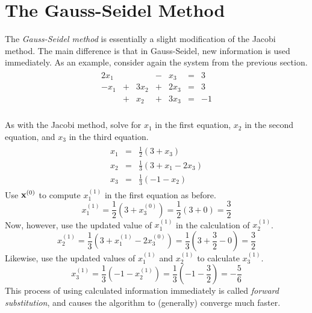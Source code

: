 \section*{The Gauss-Seidel Method} %

The \emph{Gauss-Seidel method} is essentially a slight modification of the Jacobi method.
The main difference is that in Gauss-Seidel, new information is used immediately.
As an example, consider again the system from the previous section.
\begin{align*}
\begin{array}{ccccccr}
  2x_1 &   &      & - & x_3  & = & 3  \\
  -x_1 & + & 3x_2 & + & 2x_3 & = & 3  \\
       & + & x_2  & + & 3x_3 & = & -1 \\
\end{array}
\end{align*}

As with the Jacobi method, solve for $x_1$ in the first equation, $x_2$ in the second equation, and $x_3$ in the third equation.
\begin{align*}
\begin{array}{ccc}
    x_1 & = & \frac{1}{2}(3 + x_3) \\
    x_2 & = & \frac{1}{3}(3 + x_1 - 2x_3) \\
    x_3 & = & \frac{1}{3}(-1 - x_2)
\end{array}
\end{align*}
Use $\mathbf{x}^{(0)}$ to compute $x^{(1)}_1$ in the first equation as before.
\[x^{(1)}_1 = \frac{1}{2}(3 + x^{(0)}_3) = \frac{1}{2}(3 + 0) = \frac{3}{2}\]
Now, however, use the updated value of $x^{(1)}_1$ in the calculation of $x^{(1)}_2$.
\[x^{(1)}_2 = \frac{1}{3}(3 + x^{(1)}_1 - 2x^{(0)}_3) = \frac{1}{3}(3 + \frac{3}{2} - 0) = \frac{3}{2}\]
Likewise, use the updated values of $x^{(1)}_1$ and $x^{(1)}_2$ to calculate $x^{(1)}_3$.
\[x^{(1)}_3 = \frac{1}{3}(-1 - x^{(1)}_2) = \frac{1}{3}(-1 - \frac{3}{2}) = -\frac{5}{6}\]
This process of using calculated information immediately is called \emph{forward substitution}, and causes the algorithm to (generally) converge much faster.

